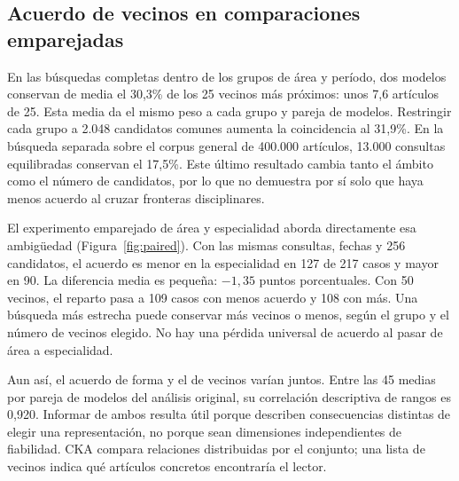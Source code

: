 \documentclass[12pt]{article}
\begin{document}
\subsection{Acuerdo de vecinos en comparaciones emparejadas}
En las búsquedas completas dentro de los grupos de área y período, dos modelos conservan de media el 30,3\% de los 25 vecinos más próximos: unos 7,6 artículos de 25. Esta media da el mismo peso a cada grupo y pareja de modelos. Restringir cada grupo a 2.048 candidatos comunes aumenta la coincidencia al 31,9\%. En la búsqueda separada sobre el corpus general de 400.000 artículos, 13.000 consultas equilibradas conservan el 17,5\%. Este último resultado cambia tanto el ámbito como el número de candidatos, por lo que no demuestra por sí solo que haya menos acuerdo al cruzar fronteras disciplinares.

El experimento emparejado de área y especialidad aborda directamente esa ambigüedad (Figura~\ref{fig:paired}). Con las mismas consultas, fechas y 256 candidatos, el acuerdo es menor en la especialidad en 127 de 217 casos y mayor en 90. La diferencia media es pequeña: $-1{,}35$ puntos porcentuales. Con 50 vecinos, el reparto pasa a 109 casos con menos acuerdo y 108 con más. Una búsqueda más estrecha puede conservar más vecinos o menos, según el grupo y el número de vecinos elegido. No hay una pérdida universal de acuerdo al pasar de área a especialidad.

Aun así, el acuerdo de forma y el de vecinos varían juntos. Entre las 45 medias por pareja de modelos del análisis original, su correlación descriptiva de rangos es 0,920. Informar de ambos resulta útil porque describen consecuencias distintas de elegir una representación, no porque sean dimensiones independientes de fiabilidad. CKA compara relaciones distribuidas por el conjunto; una lista de vecinos indica qué artículos concretos encontraría el lector.
\end{document}

